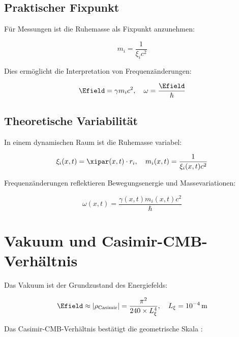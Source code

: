 \subsection{Praktischer Fixpunkt}
\label{subsec:praktischer_fixpunkt}

Für Messungen ist die Ruhemasse als Fixpunkt anzunehmen:

\begin{equation}
	m_i = \frac{1}{\xi_i c^2}
	\label{eq:ruhemasse_fixpunkt}
\end{equation}

Dies ermöglicht die Interpretation von Frequenzänderungen:

\begin{equation}
	\Efield = \gamma m_i c^2, \quad \omega = \frac{\Efield}{\hbar}
	\label{eq:frequenz_interpretation}
\end{equation}

\subsection{Theoretische Variabilität}
\label{subsec:theoretische_variabilitaet}

In einem dynamischen Raum ist die Ruhemasse variabel:

\begin{equation}
	\xi_i(x,t) = \xipar(x,t) \cdot r_i, \quad m_i(x,t) = \frac{1}{\xi_i(x,t) c^2}
	\label{eq:ruhemasse_variabel}
\end{equation}

Frequenzänderungen reflektieren Bewegungsenergie und Massevariationen:

\begin{equation}
	\omega(x,t) = \frac{\gamma(x,t) m_i(x,t) c^2}{\hbar}
	\label{eq:frequenz_variabel}
\end{equation}

\section{Vakuum und Casimir-CMB-Verhältnis}
\label{sec:vakuum_casimir_cmb}

Das Vakuum ist der Grundzustand des Energiefelds:

\begin{equation}
	\Efield \approx |\rho_{\text{Casimir}}| = \frac{\pi^2}{240 \times L_\xi^4}, \quad L_\xi = 10^{-4} \, \text{m}
	\label{eq:casimir_energie}
\end{equation}

Das Casimir-CMB-Verhältnis bestätigt die geometrische Skala \cite{Casimir1948, Planck2018}:

